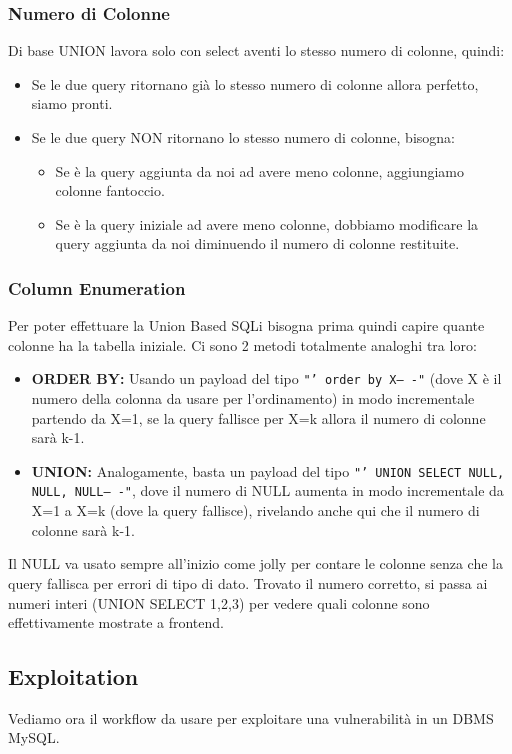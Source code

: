 \documentclass[12pt,a4paper]{report}
\begin{document}
	\subsubsection{Numero di Colonne}
	Di base UNION lavora solo con select aventi lo stesso numero di colonne, quindi:
	\begin{itemize}
		\item Se le due query ritornano già lo stesso numero di colonne allora perfetto, siamo pronti.
		\item Se le due query NON ritornano lo stesso numero di colonne, bisogna:
		\begin{itemize}
			\item Se è la query aggiunta da noi ad avere meno colonne, aggiungiamo colonne fantoccio.
			\item Se è la query iniziale ad avere meno colonne, dobbiamo modificare la query aggiunta da noi diminuendo il numero di colonne restituite.
		\end{itemize}
	\end{itemize}
	
	\subsubsection{Column Enumeration}
	Per poter effettuare la Union Based SQLi bisogna prima quindi capire quante colonne ha la tabella iniziale. Ci sono 2 metodi totalmente analoghi tra loro:
	\begin{itemize}
		\item \textbf{ORDER BY:} Usando un payload del tipo \texttt{"' order by X-- -"} (dove X è il numero della colonna da usare per l'ordinamento) in modo incrementale partendo da X=1, se la query fallisce per X=k allora il numero di colonne sarà k-1.
		\item \textbf{UNION:} Analogamente, basta un payload del tipo \texttt{"' UNION SELECT NULL, NULL, NULL-- -"}, dove il numero di NULL aumenta in modo incrementale da X=1 a X=k (dove la query fallisce), rivelando anche qui che il numero di colonne sarà k-1.
	\end{itemize}
	\begin{nota}
		Il NULL va usato sempre all'inizio come jolly per contare le colonne senza che la query fallisca per errori di tipo di dato. Trovato il numero corretto, si passa ai numeri interi (UNION SELECT 1,2,3) per vedere quali colonne sono effettivamente mostrate a frontend.
	\end{nota}
	
	\subsection{Exploitation}
	Vediamo ora il workflow da usare per exploitare una vulnerabilità in un DBMS MySQL.
	
\end{document}
